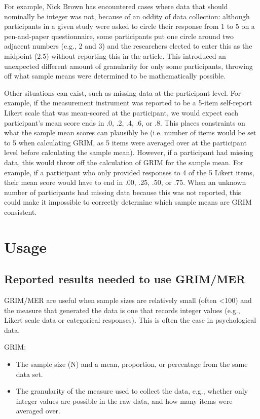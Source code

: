 \documentclass[letterpaper, 12pt]{article}
\begin{document}
{For example, Nick Brown has encountered cases where data that should nominally be integer was not, because of an oddity of data collection: although participants in a given study were asked to circle their response from 1 to 5 on a pen-and-paper questionnaire, some participants put one circle around two adjacent numbers (e.g., 2 and 3) and the researchers elected to enter this as the midpoint (2.5) without reporting this in the article. This introduced an unexpected different amount of granularity for only some participants, throwing off what sample means were determined to be mathematically possible. 

Other situations can exist, such as missing data at the participant level. For example, if the measurement instrument was reported to be a 5-item self-report Likert scale that was mean-scored at the participant, we would expect each participant's mean score ends in .0, .2, .4, .6, or .8. This places constraints on what the sample mean scores can plausibly be (i.e. number of items would be set to 5 when calculating GRIM, as 5 items were averaged over at the participant level before calculating the sample mean). However, if a participant had missing data, this would throw off the calculation of GRIM for the sample mean. For example, if a participant who only provided responses to 4 of the 5 Likert items, their mean score would have to end in .00, .25, .50, or .75. When an unknown number of participants had missing data because this was not reported, this could make it impossible to correctly determine which sample means are GRIM consistent.  

\section*{Usage}

\subsection*{Reported results needed to use GRIM/MER}

GRIM/MER are useful when sample sizes are relatively small (often <100) and the measure that generated the data is one that records integer values (e.g., Likert scale data or categorical responses). This is often the case in psychological data.

GRIM: 
  \begin{itemize}
      \item The sample size (N) and a mean, proportion, or percentage from the same data set.
      \item The granularity of the measure used to collect the data, e.g., whether only integer values are possible in the raw data, and how many items were averaged over.
  \end{itemize}

}
\end{document}
